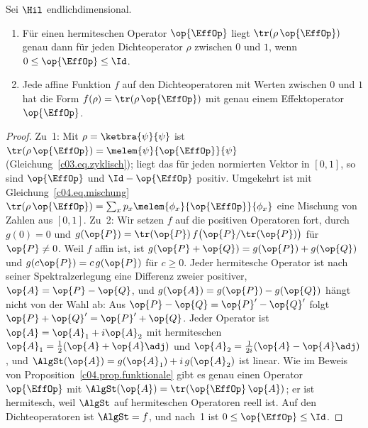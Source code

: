 \begin{proposition}\label{c04.prop.effekte}
  Sei $\Hil$ endlichdimensional.
  \begin{enumerate}
    \item Für einen hermiteschen Operator $\op{\EffOp}$ liegt $\tr(\rho\,\op{\EffOp})$ genau dann für
      jeden Dichteoperator $\rho$ zwischen $0$ und $1$, wenn $0 \leq \op{\EffOp} \leq \Id$.
    \item Jede affine Funktion $f$ auf den Dichteoperatoren mit Werten zwischen $0$ und $1$ hat die
      Form $f(\rho) = \tr(\rho\,\op{\EffOp})$ mit genau einem Effektoperator $\op{\EffOp}$.
  \end{enumerate}
\end{proposition}
\begin{proof}
  Zu~1: Mit $\rho = \ketbra{\psi}{\psi}$ ist $\tr(\rho\,\op{\EffOp}) = \melem{\psi}{\op{\EffOp}}{\psi}$
  (Gleichung~\eqref{c03.eq.zyklisch}); liegt das für jeden normierten Vektor in $[0, 1]$, so sind
  $\op{\EffOp}$ und $\Id - \op{\EffOp}$ positiv. Umgekehrt ist mit Gleichung~\eqref{c04.eq.mischung}
  $\tr(\rho\,\op{\EffOp}) = \sum_x p_x \melem{\phi_x}{\op{\EffOp}}{\phi_x}$ eine Mischung von Zahlen
  aus $[0, 1]$. Zu~2: Wir setzen $f$ auf die positiven Operatoren fort, durch $g(0) = 0$ und
  $g(\op{P}) = \tr(\op{P})\, f\bigl(\op{P}/\tr(\op{P})\bigr)$ für $\op{P} \neq 0$. Weil $f$ affin ist,
  ist $g(\op{P} + \op{Q}) = g(\op{P}) + g(\op{Q})$ und $g(c\op{P}) = c\, g(\op{P})$ für $c \geq 0$.
  Jeder hermitesche Operator ist nach seiner Spektralzerlegung eine Differenz zweier positiver,
  $\op{A} = \op{P} - \op{Q}$, und $g(\op{A}) = g(\op{P}) - g(\op{Q})$ hängt nicht von der Wahl ab: Aus
  $\op{P} - \op{Q} = \op{P}' - \op{Q}'$ folgt $\op{P} + \op{Q}' = \op{P}' + \op{Q}$. Jeder Operator ist
  $\op{A} = \op{A}_1 + i\op{A}_2$ mit hermiteschen $\op{A}_1 = \tfrac12(\op{A} + \op{A}\adj)$ und
  $\op{A}_2 = \tfrac{1}{2i}(\op{A} - \op{A}\adj)$, und $\AlgSt(\op{A}) = g(\op{A}_1) + i\,g(\op{A}_2)$
  ist linear. Wie im Beweis von Proposition~\ref{c04.prop.funktionale} gibt es genau einen Operator
  $\op{\EffOp}$ mit $\AlgSt(\op{A}) = \tr(\op{\EffOp}\,\op{A})$; er ist hermitesch, weil $\AlgSt$ auf
  hermiteschen Operatoren reell ist. Auf den Dichteoperatoren ist $\AlgSt = f$, und nach~1 ist
  $0 \leq \op{\EffOp} \leq \Id$.
\end{proof}

